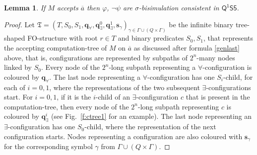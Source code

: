 \documentclass[10pt,a4paper]{amsart}
\theoremstyle{plain}
\newtheorem{lem}[thm]{Lemma}
\theoremstyle{definition}
\newcommand{\FOMS}{\ensuremath{\mathsf{Q^1S5}}}
\newcommand{\fform}[1]{\boldsymbol{#1}}
\newcommand{\qvar}{\fform{q}}
\newcommand{\svar}{\fform{s}}
\newcommand{\inpw}{\overline{a}}
\newcommand{\config}{c}
\newcommand{\qA}{\qvar_\forall}
\newcommand{\qE}{\qvar_\exists}
\newcommand{\treemod}{\mathfrak T}
\newcommand{\treedom}{T}
\newcommand{\treerel}{S}
\begin{document}
	\begin{lem}\label{l:lbsound}
		If $M$ accepts $\inpw$ then $\varphi$, $\neg\psi$ are $\sigma$-bisimulation consistent in $\FOMS$.
	\end{lem}
	\begin{proof}
		Let $\treemod=(\treedom,\treerel_0,\treerel_1,\qA,\qE^0,\qE^1,\svar_\gamma)_{\gamma\in\Gamma\cup(Q\times\Gamma)}$ be the infinite binary tree-shaped FO-structure with root $r\in\treedom$ and binary predicates $\treerel_0,\treerel_1$, that represents the accepting computation-tree of $M$ on $\inpw$ as discussed after formula \eqref{genlast} above, that is, configurations are represented by subpaths of $2^n$-many nodes linked by $\treerel_0$.
		Every node of the $2^n$-long subpath representing a $\forall$-configuration is coloured by $\qA$.
		The last node representing a $\forall$-configuration has one $S_i$-child, for each of $i=0,1$, where the representations of the two subsequent $\exists$-configurations start.
		For $i=0,1$, if it is the $i$-child of an $\exists$-configuration $\config$ that is present in the computation-tree, then
		every node of the $2^n$-long subpath representing $\config$ is coloured by $\qE^i$
		(see Fig.~\ref{f:ctree1} for an example).
		The last node representing an $\exists$-configuration has one $S_0$-child, where the representation of the next configuration starts.
		Nodes representing a configuration are also coloured
		with $\svar_\gamma$ for the corresponding symbol $\gamma$ from 
		$\Gamma\cup(Q\times\Gamma)$.
		

\end{proof}
\end{document}
